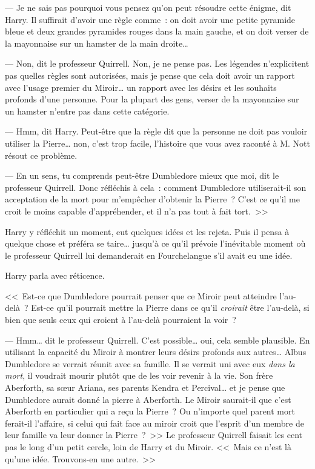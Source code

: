 --- Je ne sais pas pourquoi vous pensez qu'on peut résoudre cette énigme, dit Harry. Il suffirait d'avoir une règle comme~: on doit avoir une petite pyramide bleue et deux grandes pyramides rouges dans la main gauche, et on doit verser de la mayonnaise sur un hamster de la main droite…

--- Non, dit le professeur Quirrell. Non, je ne pense pas. Les légendes n'explicitent pas quelles règles sont autorisées, mais je pense que cela doit avoir un rapport avec l'usage premier du Miroir… un rapport avec les désirs et les souhaits profonds d'une personne. Pour la plupart des gens, verser de la mayonnaise sur un hamster n'entre pas dans cette catégorie.

--- Hmm, dit Harry. Peut-être que la règle dit que la personne ne doit pas vouloir utiliser la Pierre… non, c'est trop facile, l'histoire que vous avez raconté à M. Nott résout ce problème.

--- En un sens, tu comprends peut-être Dumbledore mieux que moi, dit le professeur Quirrell. Donc réfléchis à cela~: comment Dumbledore utiliserait-il son acceptation de la mort pour m'empêcher d'obtenir la Pierre~? C'est ce qu'il me croit le moins capable d'appréhender, et il n'a pas tout à fait tort.~>>

Harry y réfléchit un moment, eut quelques idées et les rejeta. Puis il pensa à quelque chose et préféra se taire… jusqu'à ce qu'il prévoie l'inévitable moment où le professeur Quirrell lui demanderait en Fourchelangue s'il avait eu une idée.

Harry parla avec réticence.

<<~Est-ce que Dumbledore pourrait penser que ce Miroir peut atteindre l'au-delà~? Est-ce qu'il pourrait mettre la Pierre dans ce qu'il \emph{croirait} être l'au-delà, si bien que seuls ceux qui croient à l'au-delà pourraient la voir~?

--- Hmm… dit le professeur Quirrell. C'est possible… oui, cela semble plausible. En utilisant la capacité du Miroir à montrer leurs désirs profonds aux autres… Albus Dumbledore se verrait réunit avec sa famille. Il se verrait uni avec eux \emph{dans la mort}, il voudrait mourir plutôt que de les voir revenir à la vie. Son frère Aberforth, sa sœur Ariana, ses parents Kendra et Percival… et je pense que Dumbledore aurait donné la pierre à Aberforth. Le Miroir saurait-il que c'est Aberforth en particulier qui a reçu la Pierre~? Ou n'importe quel parent mort ferait-il l'affaire, si celui qui fait face au miroir croit que l'esprit d'un membre de leur famille va leur donner la Pierre~?~>> Le professeur Quirrell faisait les cent pas le long d'un petit cercle, loin de Harry et du Miroir. <<~Mais ce n'est là qu'une idée. Trouvons-en une autre.~>>

